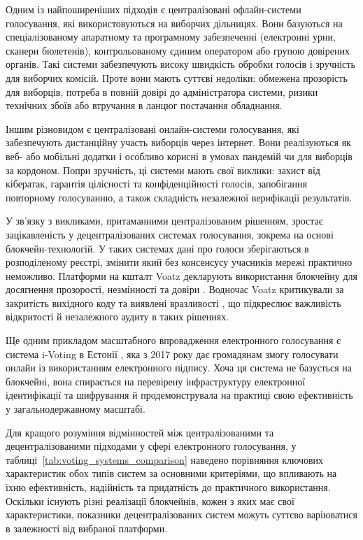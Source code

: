 \documentclass[14pt]{extreport}
\begin{document}
  Одним із найпоширеніших підходів є централізовані офлайн-системи голосування, які використовуються на виборчих дільницях. Вони базуються на спеціалізованому апаратному та програмному забезпеченні (електронні урни, сканери бюлетенів), контрольованому єдиним оператором або групою довірених органів. Такі системи забезпечують високу швидкість обробки голосів і зручність для виборчих комісій. Проте вони мають суттєві недоліки: обмежена прозорість для виборців, потреба в повній довірі до адміністратора системи, ризики технічних збоїв або втручання в ланцюг постачання обладнання.

  Іншим різновидом є централізовані онлайн-системи голосування, які забезпечують дистанційну участь виборців через інтернет. Вони реалізуються як веб- або мобільні додатки і особливо корисні в умовах пандемій чи для виборців за кордоном. Попри зручність, ці системи мають свої виклики: захист від кібератак, гарантія цілісності та конфіденційності голосів, запобігання повторному голосуванню, а також складність незалежної верифікації результатів.
  
  У зв’язку з викликами, притаманними централізованим рішенням, зростає зацікавленість у децентралізованих системах голосування, зокрема на основі блокчейн-технологій. У таких системах дані про голоси зберігаються в розподіленому реєстрі, змінити який без консенсусу учасників мережі практично неможливо. Платформи на кшталт Voatz декларують використання блокчейну для досягнення прозорості, незмінності та довіри \cite{voatz}. Водночас Voatz критикували за закритість вихідного коду та виявлені вразливості \cite{voatzcriticism}, що підкреслює важливість відкритості й незалежного аудиту в таких рішеннях.

  Ще одним прикладом масштабного впровадження електронного голосування є система i-Voting в Естонії \cite{ivoting}, яка з 2017 року дає громадянам змогу голосувати онлайн із використанням електронного підпису. Хоча ця система не базується на блокчейні, вона спирається на перевірену інфраструктуру електронної ідентифікації та шифрування й продемонструвала на практиці свою ефективність у загальнодержавному масштабі.
  
  Для кращого розуміння відмінностей між централізованими та децентралізованими підходами у сфері електронного голосування, у таблиці~\ref{tab:voting_systems_comparison} наведено порівняння ключових характеристик обох типів систем за основними критеріями, що впливають на їхню ефективність, надійність та придатність до практичного використання. Оскільки існують різні реалізації блокчейнів, кожен з яких має свої характеристики, показники децентралізованих систем можуть суттєво варіюватися в залежності від вибраної платформи.
  
\end{document}

